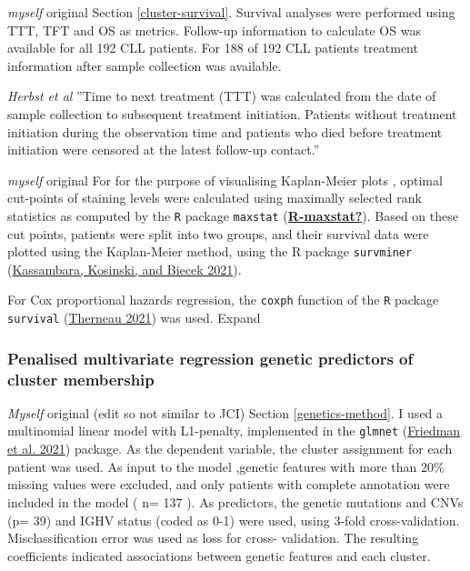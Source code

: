 \documentclass[11pt, a4paper, twosided]{book}
\begin{document}
\emph{myself} original
Section \ref{cluster-survival}. Survival analyses were performed using TTT, TFT and OS as metrics. Follow-up information to calculate OS was available for all 192 CLL patients. For 188 of 192 CLL patients treatment information after sample collection was available.

\emph{Herbst et al}
''Time to next treatment (TTT) was calculated from the date of sample collection to subsequent
treatment initiation. Patients without treatment initiation during the observation time and
patients who died before treatment initiation were censored at the latest follow-up contact.''

\emph{myself} original
For for the purpose of visualising Kaplan-Meier plots , optimal cut-points of staining levels were calculated using maximally selected rank statistics as computed by the \texttt{R} package \texttt{maxstat} (\protect\hyperlink{ref-R-maxstat}{\textbf{R-maxstat?}}). Based on these cut points, patients were split into two groups, and their survival data were plotted using the Kaplan-Meier method, using the R package \texttt{survminer} (\protect\hyperlink{ref-R-survminer}{Kassambara, Kosinski, and Biecek 2021}).

For Cox proportional hazards regression, the \texttt{coxph} function of the \texttt{R} package \texttt{survival} (\protect\hyperlink{ref-R-survival}{Therneau 2021}) was used. Expand

\hypertarget{cluster-genetics-method}{%
\subsubsection{Penalised multivariate regression genetic predictors of cluster membership}\label{cluster-genetics-method}}

\emph{Myself} original (edit so not similar to JCI)
Section \ref{genetics-method}. I used a multinomial linear model with L1-penalty, implemented in the \texttt{glmnet} (\protect\hyperlink{ref-R-glmnet}{Friedman et al. 2021}) package. As the dependent variable, the cluster assignment for each patient was used. As input to the model ,genetic features with more than 20\% missing values were excluded, and only patients with complete annotation were included in the model ( n= 137 ). As predictors, the genetic mutations and CNVs (p= 39) and IGHV status (coded as 0-1) were used, using 3-fold cross-validation. Misclassification error was used as loss for cross- validation. The resulting coefficients indicated associations between genetic features and each cluster.
\end{document}

